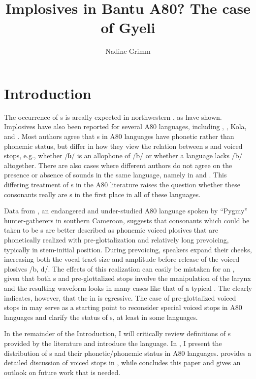 \documentclass[output=paper,modfonts,nonflat,
colorlinks, citecolor=brown,
draftmode,
]{langsci/langscibook}
\author{Nadine Grimm\affiliation{University of Rochester}}
\title{Implosives in Bantu A80? The case of Gyeli}
\begin{document}
\maketitle


\section{Introduction} 
\label{sec:grimm:1}

 The occurrence of s is areally expected in northwestern , as  \citet[58]{Clements2008} have shown. Implosives have also been reported for several  A80 languages, including , , Kola, and . Most authors agree that s in A80 languages have phonetic rather than phonemic status, but differ in how they view the relation between s and voiced stops, e.g., whether /ɓ/ is an allophone of /b/ or whether a language lacks /b/ altogether. There are also cases where different authors do not agree on the presence or absence of  sounds in the same language, namely in  and . This differing treatment of s in the A80 literature raises the question whether these consonants really are s in the first place in all of these languages.

Data from , an endangered and under-studied  A80 language spoken by ``Pygmy'' hunter-gatherers in southern Cameroon, suggests that consonants which could be taken to be s are better described as phonemic voiced plosives that are phonetically realized with pre-glottalization and relatively long prevoicing, typically in stem-initial position. During prevoicing, speakers expand their cheeks, increasing both the vocal tract size and amplitude before release of the voiced plosives /b, d/.   The effects of this realization can easily be mistaken for an , given that both s and pre-glottalized stops involve the manipulation of the larynx and the resulting waveform looks in many cases like that of a typical . The  clearly indicates, however, that the  in  is egressive. The case of pre-glottalized voiced stops in  may serve as a starting point to reconsider special voiced stops in A80 languages and clarify the status of s, at least in some languages.

In the remainder of the Introduction, I will critically review definitions of s provided by the literature and introduce the  language. In , I present the distribution of s and their phonetic/phonemic status in  A80 languages.  provides a detailed discussion of voiced stops in , while  concludes this paper and gives an outlook on future work that is needed.
\end{document}
